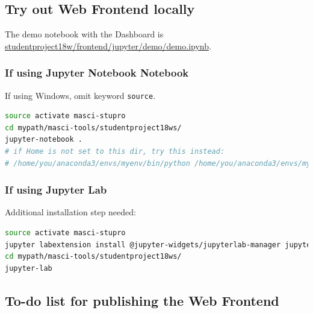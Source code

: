 \subsection{Try out Web Frontend
locally}\label{try-out-web-frontend-locally}

The demo notebook with the Dashboard is
\url{studentproject18w/frontend/jupyter/demo/demo.ipynb}.

\subsubsection{If using Jupyter Notebook
Notebook}\label{if-using-jupyter-notebook}

If using Windows, omit keyword \texttt{source}.

\begin{lstlisting}[language=bash, style=code]
source activate masci-stupro
cd mypath/masci-tools/studentproject18ws/
jupyter-notebook .
# if Home is not set to this dir, try this instead:
# /home/you/anaconda3/envs/myenv/bin/python /home/you/anaconda3/envs/myenv/bin/jupyter-notebook .
\end{lstlisting}


\subsubsection{If using Jupyter Lab}\label{if-using-jupyter-lab}

Additional installation step needed:

\begin{lstlisting}[language=bash, style=code]
source activate masci-stupro
jupyter labextension install @jupyter-widgets/jupyterlab-manager jupyter-matplotlib ipyvolume
cd mypath/masci-tools/studentproject18ws/
jupyter-lab
\end{lstlisting}

\subsection{To-do list for publishing the Web
Frontend}\label{to-do-list-for-publishing-the-web-frontend}

